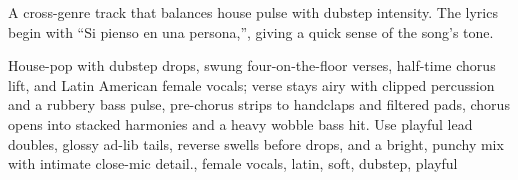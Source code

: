 
\label{sec:si-pienso-en-ti}

\begin{notes}
A cross-genre track that balances house pulse with dubstep intensity. %
The lyrics begin with “Si pienso en una persona,”, giving a quick sense of the song’s tone.
\end{notes}

\begin{style}
House-pop with dubstep drops, swung four-on-the-floor verses, half-time chorus lift, and Latin American female vocals; verse stays airy with clipped percussion and a rubbery bass pulse, pre-chorus strips to handclaps and filtered pads, chorus opens into stacked harmonies and a heavy wobble bass hit. %
Use playful lead doubles, glossy ad-lib tails, reverse swells before drops, and a bright, punchy mix with intimate close-mic detail., female vocals, latin, soft, dubstep, playful
\end{style}

